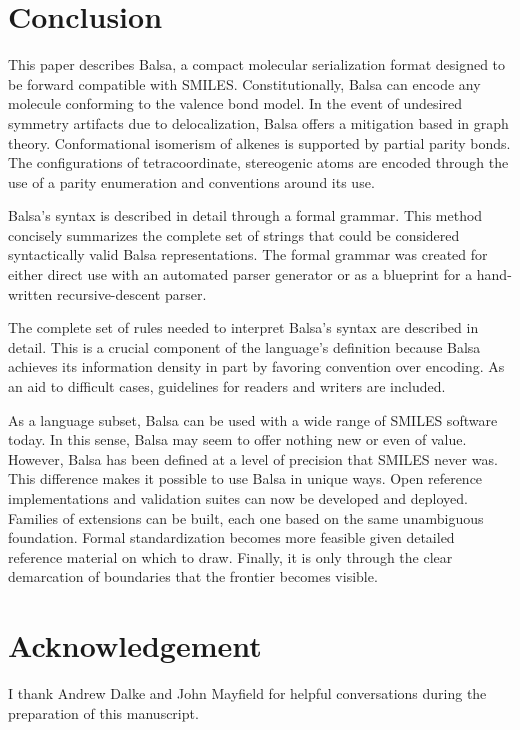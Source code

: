 \documentclass{article}
\begin{document}
\section*{Conclusion}

This paper describes Balsa, a compact molecular serialization format designed to be forward compatible with SMILES. Constitutionally, Balsa can encode any molecule conforming to the valence bond model. In the event of undesired symmetry artifacts due to delocalization, Balsa offers a mitigation based in graph theory. Conformational isomerism of alkenes is supported by partial parity bonds. The configurations of tetracoordinate, stereogenic atoms are encoded through the use of a parity enumeration and conventions around its use.

Balsa's syntax is described in detail through a formal grammar. This method concisely summarizes the complete set of strings that could be considered syntactically valid Balsa representations. The formal grammar was created for either direct use with an automated parser generator or as a blueprint for a hand-written recursive-descent parser.

The complete set of rules needed to interpret Balsa's syntax are described in detail. This is a crucial component of the language's definition because Balsa achieves its information density in part by favoring convention over encoding. As an aid to difficult cases, guidelines for readers and writers are included.

As a language subset, Balsa can be used with a wide range of SMILES software today. In this sense, Balsa may seem to offer nothing new or even of value. However, Balsa has been defined at a level of precision that SMILES never was. This difference makes it possible to use Balsa in unique ways. Open reference implementations and validation suites can now be developed and deployed. Families of extensions can be built, each one based on the same unambiguous foundation. Formal standardization becomes more feasible given detailed reference material on which to draw. Finally, it is only through the clear demarcation of boundaries that the frontier becomes visible.

\section*{Acknowledgement}

I thank Andrew Dalke and John Mayfield for helpful conversations during the preparation of this manuscript.

\clearpage
\printbibliography
\end{document}
